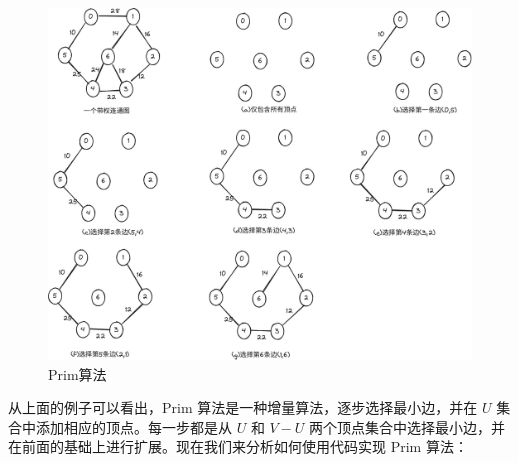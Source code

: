 \documentclass[lang=cn,newtx,10pt,scheme=chinese]{../elegantbook}
\begin{document}
\begin{figure}[h!]
  \centering
  \includegraphics[width=1\textwidth]{./figure/pdf/cropped/prime.pdf}
  \caption{Prim算法}
  \label{fig:prim}
\end{figure}

从上面的例子可以看出，Prim 算法是一种增量算法，逐步选择最小边，并在 $U$ 集合中添加相应的顶点。每一步都是从 $U$ 和 $V-U$ 两个顶点集合中选择最小边，并在前面的基础上进行扩展。现在我们来分析如何使用代码实现 Prim 算法：
\end{document}
